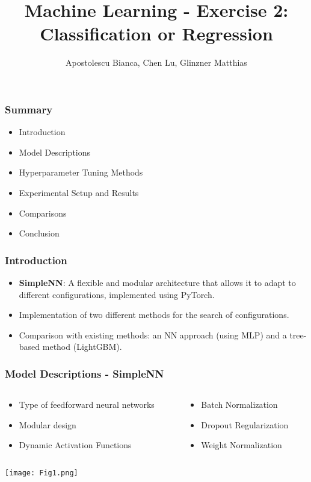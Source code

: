\documentclass[10pt]{beamer}
\title{Machine Learning - Exercise 2: Classification or Regression}
\author{Apostolescu Bianca, Chen Lu, Glinzner Matthias}
\date{}
\begin{document}
\maketitle

\begin{frame}
\frametitle{Summary}
\begin{itemize}
\item Introduction
\item Model Descriptions
\item Hyperparameter Tuning Methods
\item Experimental Setup and Results
\item Comparisons
\item Conclusion
\end{itemize}
\end{frame}

\begin{frame}
\frametitle{Introduction}
\begin{itemize}
\item \textbf{SimpleNN}: A flexible and modular architecture that allows it to adapt to different configurations, implemented using PyTorch.
\item Implementation of two different methods for the search of configurations.
\item Comparison with existing methods: an NN approach (using MLP) and a tree-based method (LightGBM).
\end{itemize}
\end{frame}

\begin{frame}
\frametitle{Model Descriptions - SimpleNN}
\begin{columns}[T]
\begin{column}{6cm}
\begin{itemize}
\item Type of feedforward neural networks
\item Modular design 
\item Dynamic Activation Functions
\end{itemize}
\end{column}
\begin{column}{6cm}
\begin{itemize}
\item Batch Normalization
\item Dropout Regularization
\item Weight Normalization
\end{itemize}
\end{column}
\end{columns}
\texttt{[image: Fig1.png]}
\end{frame}
\end{document}
